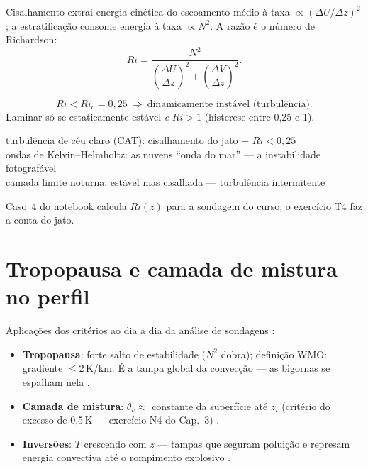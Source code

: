\documentclass[11pt]{article}
\begin{document}

\begin{formadif}
Cisalhamento extrai energia cinética do escoamento médio à taxa
$\propto (\Delta U/\Delta z)^2$; a estratificação consome energia à taxa
$\propto N^2$. A razão é o número de Richardson:
\[ Ri = \frac{N^2}{\left(\dfrac{\Delta U}{\Delta z}\right)^2
 + \left(\dfrac{\Delta V}{\Delta z}\right)^2}. \]
\end{formadif}

\begin{formalivro}
\[ Ri < Ri_c = 0{,}25 \ \Rightarrow\ \text{dinamicamente instável
(turbulência)}. \]
Laminar só se estaticamente estável \emph{e} $Ri > 1$ (histerese entre
0{,}25 e 1).
\end{formalivro}

\begin{noquadro}
turbulência de céu claro (CAT): cisalhamento do jato $+$ $Ri<0{,}25$
\hfill {}\\
ondas de Kelvin--Helmholtz: as nuvens ``onda do mar'' — a instabilidade
fotografável\\
camada limite noturna: estável mas cisalhada — turbulência intermitente
\hfill {}
\end{noquadro}

Caso~4 do notebook calcula $Ri(z)$ para a sondagem do curso; o exercício
T4 faz a conta do jato.

\section{Tropopausa e camada de mistura no perfil}\label{sec:tropo}

Aplicações dos critérios ao dia a dia da análise de sondagens
:
\begin{itemize}
  \item \textbf{Tropopausa}: forte salto de estabilidade ($N^2$ dobra);
        definição WMO: gradiente $\le 2$\,K/km. É a tampa global da
        convecção — as bigornas se espalham nela
        .
  \item \textbf{Camada de mistura}: $\theta_v \approx$ constante da
        superfície até $z_i$ (critério do excesso de 0{,}5\,K —
        exercício N4 do Cap.~3) .
  \item \textbf{Inversões}: $T$ crescendo com $z$ — tampas que seguram
        poluição  e represam energia
        convectiva até o rompimento explosivo
        .
\end{itemize}
\end{document}
